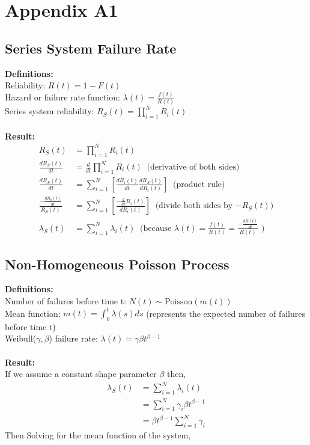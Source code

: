 \documentclass[12pt]{article}
\begin{document}
\section{Appendix A1}
\subsection{Series System Failure Rate}

\textbf{Definitions:} \\
\noindent
Reliability: $R(t) = 1 - F(t)$ \\
Hazard or failure rate function: $\lambda(t) = \frac{f(t)}{R(t)}$ \\
Series system reliability: $R_S(t) = \prod_{i = 1}^N R_i(t)$
\\
\\
\textbf{Result:}
$$
\begin{aligned}
	R_S(t) &= \prod_{i = 1}^N R_i(t) \\
	\frac{dR_S(t)}{dt} &= \frac{d}{dt} \prod_{i = 1}^N R_i(t) \; \; \text{(derivative of both sides)} \\
	\frac{dR_S(t)}{dt} &= \sum_{i=1}^N \left[ \frac{dR_i(t)}{dt} \frac{dR_S(t)}{dR_i(t)} \right] \; \; \text{(product rule)} \\
    \frac{-\frac{dR_S(t)}{dt}}{R_S(t)} &= \sum_{i=1}^N \left[  \frac{-\frac{d}{dt}R_i(t)}{dR_i(t)} \right] \; \; \text{(divide both sides by $-R_S(t)$)} \\
    \lambda_S(t) &= \sum_{i = 1}^N \lambda_i(t) \; \; \text{(because $\lambda(t) = \frac{f(t)}{R(t)} = \frac{-\frac{dR(t)}{dt}}{R(t)}$ )}
\end{aligned}
$$

\subsection{Non-Homogeneous Poisson Process}

\textbf{Definitions:} \\
\noindent
Number of failures before time t: $N(t) \sim \text{Poisson}(m(t))$ \\
Mean function: $m(t) = \int_0^t \lambda(s)ds$ (represents the expected number of failures before time t) \\
Weibull($\gamma, \beta $) failure rate: $\lambda(t) = \gamma\beta t^{\beta - 1}$
\\
\\
\textbf{Result:}\\
If we assume a constant shape parameter $\beta$ then,\\
$$
\begin{aligned}
	\lambda_S(t) &= \sum_{i = 1}^N \lambda_i(t) \\
    &= \sum_{i = 1}^N \gamma_i\beta t^{\beta - 1} \\
    &= \beta t^{\beta -1} \sum_{i = 1}^N \gamma_i
\end{aligned}
$$
\newpage
Then Solving for the mean function of the system,
\end{document}
